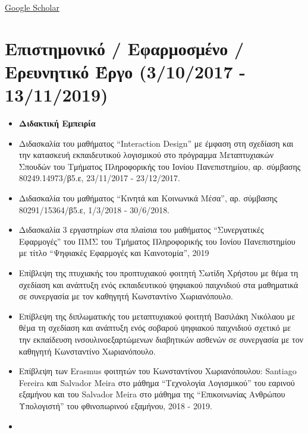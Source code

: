 \documentclass[%
    11pt,
  oneside
  ]{memoir}
\let\oldsection\section
\renewcommand{\section}[1]{%
  \oldsection{#1}
  \leavevmode
  \par
  \vspace{\dimexpr-\baselineskip-\parskip}
}
\begin{document}
\href{https://scholar.google.gr/citations?user=P5t-LWkAAAAJ\&hl=el}{Google
Scholar}

\hypertarget{ux3b5ux3c0ux3b9ux3c3ux3c4ux3b7ux3bcux3bfux3bdux3b9ux3baux3cc-ux3b5ux3c6ux3b1ux3c1ux3bcux3bfux3c3ux3bcux3adux3bdux3bf-ux3b5ux3c1ux3b5ux3c5ux3bdux3b7ux3c4ux3b9ux3baux3cc-ux3adux3c1ux3b3ux3bf-3102017---13112019}{%
\section{Επιστημονικό / Εφαρμοσμένο / Ερευνητικό Έργο (3/10/2017 -
13/11/2019)}\label{ux3b5ux3c0ux3b9ux3c3ux3c4ux3b7ux3bcux3bfux3bdux3b9ux3baux3cc-ux3b5ux3c6ux3b1ux3c1ux3bcux3bfux3c3ux3bcux3adux3bdux3bf-ux3b5ux3c1ux3b5ux3c5ux3bdux3b7ux3c4ux3b9ux3baux3cc-ux3adux3c1ux3b3ux3bf-3102017---13112019}}

\begin{itemize}
\tightlist
\item
  \textbf{Διδακτική Εμπειρία}
\item
  Διδασκαλία του μαθήματος ``Interaction Design'' με έμφαση στη σχεδίαση
  και την κατασκευή εκπαιδευτικού λογισμικού στο πρόγραμμα Μεταπτυχιακών
  Σπουδών του Τμήματος Πληροφορικής του Ιονίου Πανεπιστημίου, αρ.
  σύμβασης 80249.14973/β5.ε, 23/11/2017 - 23/12/2017.
\item
  Διδασκαλία του μαθήματος ``Κινητά και Κοινωνικά Μέσα'', αρ. σύμβασης
  80291/15364/β5.ε, 1/3/2018 - 30/6/2018.
\item
  Διδασκαλία 3 εργαστηρίων στα πλαίσια του μαθήματος ``Συνεργατικές
  Εφαρμογές'' του ΠΜΣ του Τμήματος Πληροφορικής του Ιονίου Πανεπιστημίου
  με τίτλο ``Ψηφιακές Εφαρμογές και Καινοτομία'', 2019
\item
  Επίβλεψη της πτυχιακής του προπτυχιακού φοιτητή Σωτίδη Χρήστου με θέμα
  τη σχεδίαση και ανάπτυξη ενός εκπαιδευτικού ψηφιακού παιχνιδιού στα
  μαθηματικά σε συνεργασία με τον καθηγητή Κωνσταντίνο Χωριανόπουλο.
\item
  Επίβλεψη της διπλωματικής του μεταπτυχιακού φοιτητή Βασιλάκη Νικόλαου
  με θέμα τη σχεδίαση και ανάπτυξη ενός σοβαρού ψηφιακού παιχνιδιού
  σχετικό με την εκπαίδευση ινσουλινοεξαρτώμενων διαβητικών ασθενών σε
  συνεργασία με τον καθηγητή Κωνσταντίνο Χωριανόπουλο.
\item
  Επίβλεψη των Erasmus φοιτητών του Κωνσταντίνου Χωριανόπουλου: Santiago
  Fereira και Salvador Meira στο μάθημα ``Τεχνολογία Λογισμικού'' του
  εαρινού εξαμήνου και του Salvador Meira στο μάθημα της ``Επικοινωνίας
  Ανθρώπου Υπολογιστή'' του φθινοπωρινού εξαμήνου, 2018 - 2019.
\item

\end{itemize}
\end{document}
